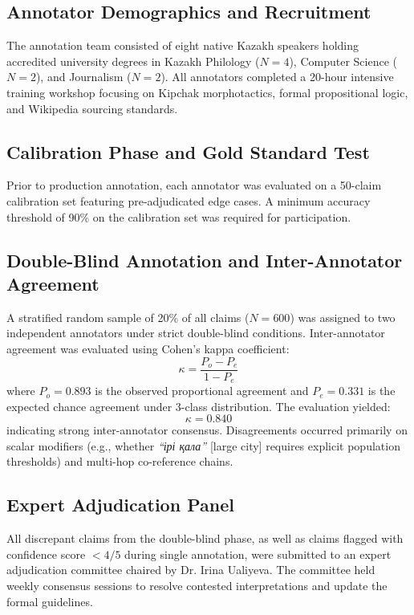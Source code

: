 \subsection{Annotator Demographics and Recruitment}
The annotation team consisted of eight native Kazakh speakers holding accredited university degrees in Kazakh Philology ($N=4$), Computer Science ($N=2$), and Journalism ($N=2$). All annotators completed a 20-hour intensive training workshop focusing on Kipchak morphotactics, formal propositional logic, and Wikipedia sourcing standards.

\subsection{Calibration Phase and Gold Standard Test}
Prior to production annotation, each annotator was evaluated on a 50-claim calibration set featuring pre-adjudicated edge cases. A minimum accuracy threshold of 90\% on the calibration set was required for participation.

\subsection{Double-Blind Annotation and Inter-Annotator Agreement}
A stratified random sample of 20\% of all claims ($N = 600$) was assigned to two independent annotators under strict double-blind conditions. Inter-annotator agreement was evaluated using Cohen's kappa coefficient:
\begin{equation}
\label{eq:cohens_kappa}
\kappa = \frac{P_o - P_e}{1 - P_e}
\end{equation}
where $P_o = 0.893$ is the observed proportional agreement and $P_e = 0.331$ is the expected chance agreement under 3-class distribution. The evaluation yielded:
\begin{equation}
\kappa = 0.840
\end{equation}
indicating strong inter-annotator consensus. Disagreements occurred primarily on scalar modifiers (e.g., whether \textit{``ірі қала''} [large city] requires explicit population thresholds) and multi-hop co-reference chains.

\subsection{Expert Adjudication Panel}
All discrepant claims from the double-blind phase, as well as claims flagged with confidence score $< 4/5$ during single annotation, were submitted to an expert adjudication committee chaired by Dr. Irina Ualiyeva. The committee held weekly consensus sessions to resolve contested interpretations and update the formal guidelines.

